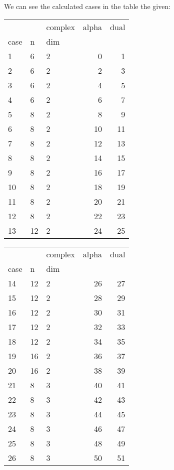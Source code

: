 \documentclass{article}
\begin{document}
\par We can see the calculated cases in the table the given:
\begin{center}
\begin{tabular}{lllrr}
\toprule
&  & complex & alpha & dual \\
case & n & dim &  &  \\
\midrule
1 & 6 & 2 & 0 & 1 \\
\cline{1-5} \cline{2-5}
2 & 6 & 2 & 2 & 3 \\
\cline{1-5} \cline{2-5}
3 & 6 & 2 & 4 & 5 \\
\cline{1-5} \cline{2-5}
4 & 6 & 2 & 6 & 7 \\
\cline{1-5} \cline{2-5}
5 & 8 & 2 & 8 & 9 \\
\cline{1-5} \cline{2-5}
6 & 8 & 2 & 10 & 11 \\
\cline{1-5} \cline{2-5}
7 & 8 & 2 & 12 & 13 \\
\cline{1-5} \cline{2-5}
8 & 8 & 2 & 14 & 15 \\
\cline{1-5} \cline{2-5}
9 & 8 & 2 & 16 & 17 \\
\cline{1-5} \cline{2-5}
10 & 8 & 2 & 18 & 19 \\
\cline{1-5} \cline{2-5}
11 & 8 & 2 & 20 & 21 \\
\cline{1-5} \cline{2-5}
12 & 8 & 2 & 22 & 23 \\
\cline{1-5} \cline{2-5}
13 & 12 & 2 & 24 & 25 \\
\cline{1-5} \cline{2-5}
\bottomrule
\end{tabular}
\begin{tabular}{lllrr}
\toprule
&  & complex & alpha & dual \\
case & n & dim &  &  \\
\midrule
14 & 12 & 2 & 26 & 27 \\
\cline{1-5} \cline{2-5}
15 & 12 & 2 & 28 & 29 \\
\cline{1-5} \cline{2-5}
16 & 12 & 2 & 30 & 31 \\
\cline{1-5} \cline{2-5}
17 & 12 & 2 & 32 & 33 \\
\cline{1-5} \cline{2-5}
18 & 12 & 2 & 34 & 35 \\
\cline{1-5} \cline{2-5}
19 & 16 & 2 & 36 & 37 \\
\cline{1-5} \cline{2-5}
20 & 16 & 2 & 38 & 39 \\
\cline{1-5} \cline{2-5}
21 & 8 & 3 & 40 & 41 \\
\cline{1-5} \cline{2-5}
22 & 8 & 3 & 42 & 43 \\
\cline{1-5} \cline{2-5}
23 & 8 & 3 & 44 & 45 \\
\cline{1-5} \cline{2-5}
24 & 8 & 3 & 46 & 47 \\
\cline{1-5} \cline{2-5}
25 & 8 & 3 & 48 & 49 \\
\cline{1-5} \cline{2-5}
26 & 8 & 3 & 50 & 51 \\
\cline{1-5} \cline{2-5}
\bottomrule
\end{tabular}

\end{center}
\end{document}

